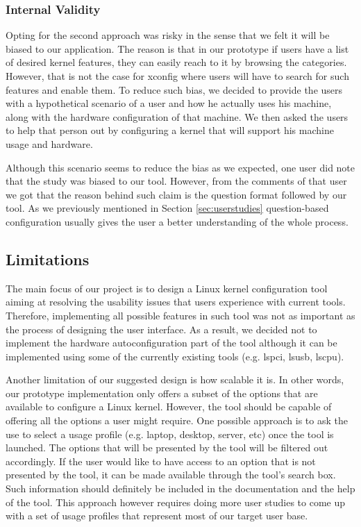 \documentclass{chi2009}
\begin{document}
\subsubsection{Internal Validity}
Opting for the second approach was risky in the sense that we felt it will be biased to our application. The reason is that in our prototype if users have a
list of desired kernel features, they can easily reach to it by browsing the categories. However, that is not the case for \textsf{xconfig} where users will
have to search for such features and enable them. To reduce such bias, we decided to provide the users with a hypothetical scenario of a user and how he
actually uses his machine, along with the hardware configuration of that machine. We then asked the users to help that person out by configuring a kernel that
will support his machine usage and hardware.

Although this scenario seems to reduce the bias as we expected, one user did note that the study was biased to our tool. However, from the comments of that
user we got that the reason behind such claim is the question format followed by our tool. As we previously mentioned in Section \ref{sec:userstudies}
question-based configuration usually gives the user a better understanding of the whole process.

\subsection{Limitations}
The main focus of our project is to design a Linux kernel configuration tool aiming at resolving the usability issues that users experience with current tools.
Therefore, implementing all possible features in such tool was not as important as the process of designing the user interface. As a result, we decided not to
implement the hardware autoconfiguration part of the tool although it can be implemented using some of the currently existing tools (e.g. \textsf{lspci},
\textsf{lsusb}, \textsf{lscpu}).

Another limitation of our suggested design is how scalable it is. In other words, our prototype implementation only offers a subset of the options that are
available to configure a Linux kernel. However, the tool should be capable of offering all the options a user might require. One possible approach is to ask the
use to select a usage profile (e.g. laptop, desktop, server, etc) once the tool is launched. The options that will be presented by the tool will be filtered out
accordingly. If the user would like to have access to an option that is not presented by the tool, it can be made available through the tool's search box. Such
information should definitely be included in the documentation and the help of the tool. This approach however requires doing more user studies to come up with
a set of usage profiles that represent most of our target user base.
\end{document}
